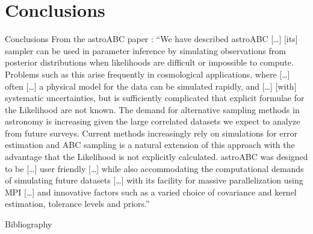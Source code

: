 \documentclass{beamer}
\theoremstyle{remark}
\newcommand{\nologo}{\setbeamertemplate{logo}{}} %
\begin{document}
\section{Conclusions}
{\nologo
\begin{frame}{Conclusions}
From the astroABC paper \cite{astroABC}: ``We have described astroABC [\dots] [its] sampler can be used in parameter inference by simulating observations from posterior distributions when likelihoods are difficult or impossible to compute. Problems such as this arise frequently in cosmological applications, where [\dots] often [\dots] a physical model for the data can be simulated rapidly, and [\dots] [with] systematic uncertainties, but is sufficiently complicated that explicit formulae for the Likelihood are not known. The demand for alternative sampling methods in astronomy is increasing given the large correlated datasets we expect to analyze from future surveys. Current methods increasingly rely on simulations for error estimation and ABC sampling is a natural extension of this approach with the advantage that the Likelihood is not explicitly calculated. astroABC was designed to be [\dots] user friendly [\dots] while also accommodating the computational demands of simulating future datasets [\dots] with its facility for massive parallelization using MPI [\dots] and innovative factors such as a varied choice of covariance and kernel estimation, tolerance levels and priors.''
\end{frame}
}


{\nologo
\begin{frame}[allowframebreaks]{Bibliography}
\nocite{*}
\printbibliography%
\end{frame}
}
\end{document}
